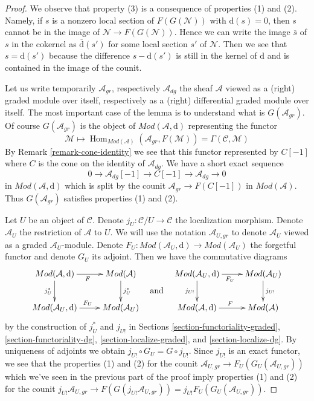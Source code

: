 \documentclass{stacks-project}
\theoremstyle{plain}
\theoremstyle{definition}
\theoremstyle{remark}
\numberwithin{equation}{subsection}
\def\Hom{\mathop{\mathrm{Hom}}\nolimits}
\begin{document}
\begin{proof}
We observe that property (3) is a consequence of properties (1) and (2).
Namely, if $s$ is a nonzero local section of $F(G(\mathcal{N}))$
with $\text{d}(s) = 0$, then $s$ cannot be in the image of
$\mathcal{N} \to F(G(\mathcal{N}))$. Hence we can write the image
$\overline{s}$ of $s$ in the cokernel as
$\overline{\text{d}}(s')$ for some local section $s'$ of $\mathcal{N}$.
Then we see that $s = \text{d}(s')$ because the difference
$s - \text{d}(s')$ is still in the kernel of $\text{d}$
and is contained in the image of the counit.

\medskip\noindent
Let us write temporarily $\mathcal{A}_{gr}$, respectively $\mathcal{A}_{dg}$
the sheaf $\mathcal{A}$ viewed as a (right) graded module over itself,
respectively as a (right) differential graded module over itself.
The most important case of the lemma is to understand what
is $G(\mathcal{A}_{gr})$. Of course $G(\mathcal{A}_{gr})$ is the object
of $\textit{Mod}(\mathcal{A}, \text{d})$ representing the
functor
$$
\mathcal{M} \longmapsto
\Hom_{\textit{Mod}(\mathcal{A})}(\mathcal{A}_{gr}, F(\mathcal{M})) =
\Gamma(\mathcal{C}, \mathcal{M})
$$
By Remark \ref{remark-cone-identity} we see that this functor represented
by $C[-1]$ where $C$ is the cone on the identity of $\mathcal{A}_{dg}$.
We have a short exact sequence
$$
0 \to \mathcal{A}_{dg}[-1] \to C[-1] \to \mathcal{A}_{dg} \to 0
$$
in $\textit{Mod}(\mathcal{A}, \text{d})$ which is split by the
counit $\mathcal{A}_{gr} \to F(C[-1])$ in $\textit{Mod}(\mathcal{A})$.
Thus $G(\mathcal{A}_{gr})$ satisfies properties (1) and (2).

\medskip\noindent
Let $U$ be an object of $\mathcal{C}$. Denote
$j_U : \mathcal{C}/U \to \mathcal{C}$ the localization morphism.
Denote $\mathcal{A}_U$ the restriction of $\mathcal{A}$ to $U$.
We will use the notation $\mathcal{A}_{U, gr}$ to denote
$\mathcal{A}_U$ viewed as a graded $\mathcal{A}_U$-module.
Denote $F_U : \textit{Mod}(\mathcal{A}_U, \text{d}) \to
\textit{Mod}(\mathcal{A}_U)$ the forgetful functor and denote
$G_U$ its adjoint. Then we have the commutative diagrams
$$
\vcenter{
\xymatrix{
\textit{Mod}(\mathcal{A}, \text{d}) \ar[d]_{j_U^*} \ar[r]_F &
\textit{Mod}(\mathcal{A}) \ar[d]^{j_U^*} \\
\textit{Mod}(\mathcal{A}_U, \text{d}) \ar[r]^{F_U} &
\textit{Mod}(\mathcal{A}_U)
}
}
\quad\text{and}\quad
\vcenter{
\xymatrix{
\textit{Mod}(\mathcal{A}_U, \text{d}) \ar[r]_{F_U} \ar[d]_{j_{U!}} &
\textit{Mod}(\mathcal{A}_U) \ar[d]^{j_{U!}} \\
\textit{Mod}(\mathcal{A}, \text{d}) \ar[r]^F &
\textit{Mod}(\mathcal{A})
}
}
$$
by the construction of $j^*_U$ and $j_{U!}$ in
Sections \ref{section-functoriality-graded},
\ref{section-functoriality-dg},
\ref{section-localize-graded}, and
\ref{section-localize-dg}.
By uniqueness of adjoints we obtain $j_{U!} \circ G_U = G \circ j_{U!}$.
Since $j_{U!}$ is an exact functor, we see that the properties
(1) and (2) for the counit
$\mathcal{A}_{U, gr} \to F_U(G_U(\mathcal{A}_{U, gr}))$
which we've seen in the previous part of the proof
imply properties (1) and (2) for the counit
$j_{U!}\mathcal{A}_{U, gr} \to F(G(j_{U!}\mathcal{A}_{U, gr})) =
j_{U!}F_U(G_U(\mathcal{A}_{U, gr}))$.


\end{proof}
\end{document}
